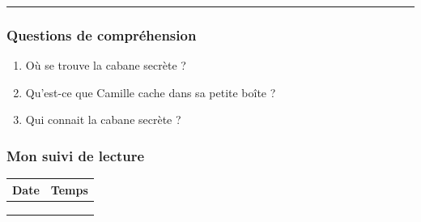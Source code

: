 \documentclass[
  french,
  french,
  14pt,
  a4paper]{extarticle}
\providecommand{\tightlist}{%
  \setlength{\itemsep}{0pt}\setlength{\parskip}{0pt}}
\begin{document}
{\begin{center}\rule{0.5\linewidth}{0.5pt}\end{center}

\subsubsection{Questions de
compréhension}\label{questions-de-compruxe9hension-2}

\begin{enumerate}
\def\labelenumi{\arabic{enumi}.}
\tightlist
\item
  Où se trouve la cabane secrète ?
\item
  Qu'est-ce que Camille cache dans sa petite boîte ?
\item
  Qui connait la cabane secrète ?
\end{enumerate}

\subsubsection{Mon suivi de lecture}\label{mon-suivi-de-lecture-2}

\begin{center}
\begin{tabularx}{\textwidth}{|X|X|}
\hline
\textbf{Date} & \textbf{Temps} \\
\hline
& \\
\hline
& \\
\hline
& \\
\hline
\end{tabularx}
\end{center}

}%
\newpage
\end{document}
